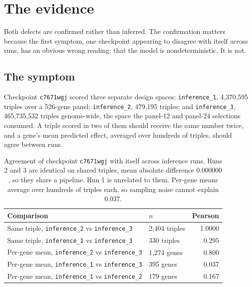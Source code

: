 
\section{The evidence}
\label{sec:evidence}

Both defects are confirmed rather than inferred. The confirmation matters because
the first symptom, one checkpoint appearing to disagree with itself across runs,
has an obvious wrong reading: that the model is nondeterministic. It is not.

\subsection{The symptom}
\label{sec:symptom}

Checkpoint \texttt{c7671wgj} scored three separate design spaces:
\texttt{inference\_1}, 4{,}370{,}595 triples over a 526-gene panel;
\texttt{inference\_2}, 479{,}195 triples; and \texttt{inference\_3},
465{,}735{,}532 triples genome-wide, the space the panel-12 and panel-24
selections consumed. A triple scored in two of them should receive the same
number twice, and a gene's mean predicted effect, averaged over hundreds of
triples, should agree between runs.

\begin{table}[htbp]
\centering
\begin{tabular}{llr}
\hline
Comparison & $n$ & Pearson \\
\hline
Same triple, \texttt{inference\_2} vs \texttt{inference\_3} & 2{,}404 triples & 1.0000 \\
Same triple, \texttt{inference\_1} vs \texttt{inference\_3} & 330 triples & 0.295 \\
Per-gene mean, \texttt{inference\_2} vs \texttt{inference\_3} & 1{,}274 genes & 0.800 \\
Per-gene mean, \texttt{inference\_1} vs \texttt{inference\_3} & 395 genes & 0.037 \\
Per-gene mean, \texttt{inference\_1} vs \texttt{inference\_2} & 179 genes & 0.167 \\
\hline
\end{tabular}
\caption{Agreement of checkpoint \texttt{c7671wgj} with itself across inference
runs. Runs 2 and 3 are identical on shared triples, mean absolute difference
$0.000000$, so they share a pipeline. Run 1 is unrelated to them. Per-gene means
average over hundreds of triples each, so sampling noise cannot explain
$0.037$.}
\label{tab:runconsistency}
\end{table}


